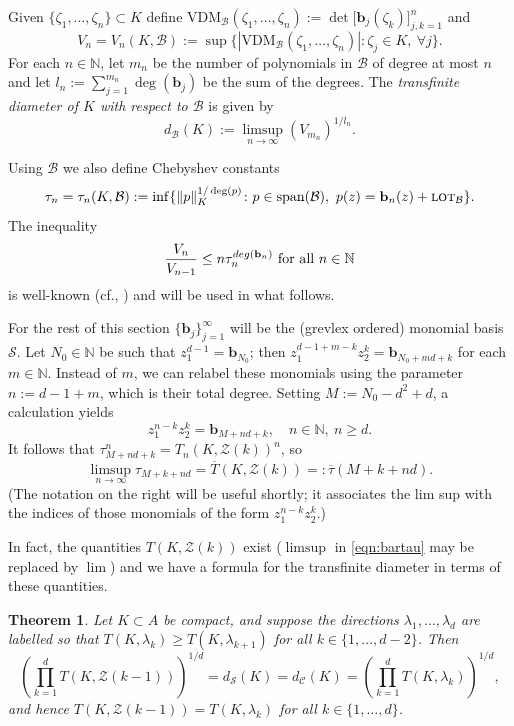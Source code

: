 \documentclass[12pt]{article}
\numberwithin{equation}{section}
\newtheorem{theorem}{Theorem}[section]
\newcommand{\N}{\mathbb{N}}
\newcommand{\calC}{\mathcal{C}}
\newcommand{\lot}{\text{\sc lot}}
\newcommand{\calZ}{\mathcal{Z}}
\newcommand{\calB}{\mathcal{B}}
\newcommand{\calS}{\mathcal{S}}
\newcommand{\VDM}{\mathrm{VDM}}
\newcommand{\bb}{\mathbf{b}}
\begin{document}
Given $\{\zeta_1,\ldots,\zeta_n\}\subset K$ define $\VDM_{\calB}(\zeta_1,\ldots,\zeta_n):=\det\bigl[\bb_j(\zeta_k)\bigr]_{j,k=1}^n$ and 
$$
V_n=V_n(K,\calB):=\sup\{|\VDM_{\calB}(\zeta_1,\ldots,\zeta_n)|\colon \zeta_j\in K,\ \forall j\}. 
$$
For each $n\in \N$, let $m_n$ be the number of polynomials in $\calB$ of degree at most $n$ and let $l_n:=\sum_{j=1}^{m_n} \deg(\bb_j)$ be the sum of the degrees. The \emph{transfinite diameter of $K$ with respect to $\calB$} is given by 
$$
d_{\calB}(K):= \limsup_{n\to\infty} \left(V_{m_n}\right)^{1/l_n}.
$$

Using $\calB$ we also define Chebyshev constants 
$$
\tau_n=\tau_n(K,\calB):= \inf\{\|p\|_K^{1/\deg(p)}\colon p\in\text{span}(\calB),\ p(z) = \bb_n(z)+\lot_{\calB}\}.
$$
The inequality 
\begin{equation}\label{eqn:vn<tn}
\frac{V_{n}}{V_{n-1}} \leq n\tau_n^{deg(\bb_n)} \hbox{ for all }n\in \N  
\end{equation}
is well-known (cf., \cite{Z}) and will be used in what follows.

For the rest of this section $\{\bb_j\}_{j=1}^{\infty}$  will be the (grevlex ordered) monomial basis $\calS$.  Let $N_0\in\N$ be such that $z_1^{d-1}=\bb_{N_0}$; then 
$z_1^{d-1+m-k}z_2^k = \bb_{N_0+md+k}$  for each  $m\in\N$.  Instead of $m$, we can relabel these monomials using the parameter $n:=d-1+m$, which is their total degree.  Setting $M:=N_0-d^2+d$, a calculation yields
$$
z_1^{n-k}z_2^k = \bb_{M+nd+k}, \quad  n\in\N, \  n\geq d.
$$
It follows that $\tau_{M+nd+k}^n=  T_n(K,\calZ(k))^n$, so 
\begin{equation}\label{eqn:bartau}
\limsup_{n\to\infty} \tau_{M+k+nd} = \overline T(K,\calZ(k))=:\overline\tau(M+k+nd).\end{equation}
(The notation on the right will be useful shortly; it associates the lim sup with the indices of those monomials of the form $z_1^{n-k}z_2^k$.)

\bigskip

In fact, the quantities  $T(K,\calZ(k))$ exist ($\limsup$ in \eqref{eqn:bartau} may be replaced by $\lim$) and we have a formula for the transfinite diameter in terms of these quantities.


\begin{theorem}\label{thm:ds=dc}
Let $K\subset A$ be compact, and suppose the directions $\lambda_1,\ldots,\lambda_d$ are labelled so that $T(K,\lambda_k)\geq T(K,\lambda_{k+1})$ for all $k\in\{1,\ldots, d-2\}$.  Then 
\begin{equation}\label{eqn:ds=dc}
\left(\prod_{k=1}^d  T(K,\calZ(k-1))\right)^{1/d} =  d_{\calS}(K) = d_{\calC}(K) = \left(\prod_{k=1}^d T(K,\lambda_k)\right)^{1/d},
\end{equation}
and hence $T(K,\calZ(k-1))=T(K,\lambda_k)$ for all $k\in\{1,\ldots,d\}$.
\end{theorem}
\end{document}
